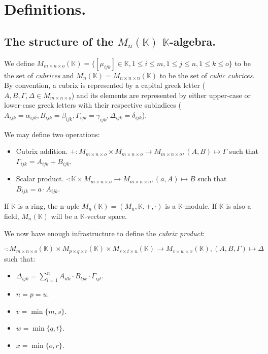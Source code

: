 \section{Definitions.} \label{defs}

\subsection{The structure of the $M_n (\mathbb{K})$ $\mathbb{K}$-algebra.} \label{defs-structure}

We define $M_{m\times n\times o} (\mathbb{K}) = \{ [\mu_{ijk}] \in \mathbb{K}, 1 \le i \le m, 1 \le j \le n, 1 \le k \le o\}$ to be the set of \textit{cubrices} and $M_n (\mathbb{K}) = M_{n\times n\times n} (\mathbb{K})$ to be the set of \textit{cubic cubrices}. By convention, a cubrix is represented by a capital greek letter ($A, B, \Gamma, \Delta \in M_{m\times n\times o}$) and its elements are represented by either upper-case or lower-case greek letters with their respective subindices ($A_{ijk} = \alpha_{ijk}, B_{ijk} = \beta_{ijk}, \Gamma_{ijk} = \gamma_{ijk}, \Delta_{ijk} = \delta_{ijk}$).

We may define two operations:

\begin{itemize}
	\item Cubrix addition. $+: M_{m\times n\times o} \times M_{m\times n\times o} \rightarrow M_{m\times n\times o}, (A, B) \mapsto \Gamma$ such that $\Gamma_{ijk} = A_{ijk} + B_{ijk}$.
	\item Scalar product. $\cdot: \mathbb{K} \times M_{m\times n\times o} \rightarrow M_{m\times n\times o}, (a, A) \mapsto B$ such that $B_{ijk} = a \cdot A_{ijk}$.
\end{itemize}

If $\mathbb{K}$ is a ring, the n-uple $M_n (\mathbb{K}) = (M_n, \mathbb{K}, +, \cdot)$ is a $\mathbb{K}$-module. If $\mathbb{K}$ is also a field, $M_n (\mathbb{K})$ will be a $\mathbb{K}$-vector space.

\newpage

We now have enough infrastructure to define the \textit{cubrix product}:

$$\cdot: M_{m\times n\times o} (\mathbb{K}) \times M_{p\times q\times r} (\mathbb{K}) \times M_{s\times t\times u} (\mathbb{K}) \rightarrow M_{v\times w\times x} (\mathbb{K}), (A, B, \Gamma) \mapsto \Delta$$ such that:

\begin{itemize}
	\item $\Delta_{ijk} = \sum\limits_{l=1}^{n} A_{ilk} \cdot B_{ljk} \cdot \Gamma_{ijl}$.
	\item $n = p = u$.
	\item $v = \min\{m, s\}$.
	\item $w = \min\{q, t\}$.
	\item $x = \min\{o, r\}$.
\end{itemize}

